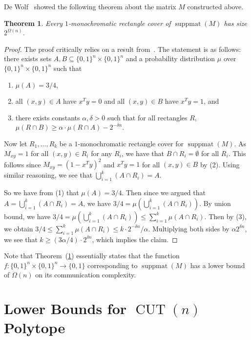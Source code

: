 \documentclass{article}
\newtheorem{theorem}{\sc Theorem}
\theoremstyle{definition}
\theoremstyle{remark}
\newcommand{\bits}{\{0,1\}}
\newcommand{\suppmat}{\operatorname{suppmat}}
\newcommand{\CUT}{\operatorname{CUT}}
\begin{document}
De Wolf~\cite{de-wolf} showed the following theorem about the matrix $M$ constructed above.
\begin{theorem}\label{theor:dewolf}
Every $1$-monochromatic rectangle cover of $\suppmat(M)$ has size $2^{\Omega(n)}$.
\end{theorem}
\begin{proof}
The proof critically relies on a result from~\cite{cc-nisan}. The statement is as follows: there exists sets $A, B \subseteq \bits^n \times \bits^n$ and a probability distribution $\mu$ over $\bits^n \times \bits^n$ such that 
\begin{enumerate}\itemsep0pt
\item $\mu(A) = 3/4$,
\item all $(x,y) \in A$ have $x^Ty =0$ and all $(x,y) \in B$ have $x^Ty = 1$, and 
\item there exists constants $\alpha, \delta > 0$ such that for all rectangles $R$,  $\mu(R \cap B) \ge \alpha \cdot \mu(R \cap A) - 2^{-\delta n}$.
\end{enumerate}

Now let $R_1, \ldots, R_k$ be a $1$-monochromatic rectangle cover for $\suppmat(M)$. As $M_{xy} = 1$ for all $(x,y) \in R_i$ for any $R_i$, we have that $B \cap R_i = \emptyset$ for all $R_i$. This follows since $M_{xy} = (1 - x^Ty)^2$ and $x^Ty = 1$ for all $(x,y) \in B$ by (2). Using similar reasoning, we see that $\bigcup_{i=1}^k (A \cap R_i) = A$. 

So we have from (1) that $\mu(A) = 3/4$. Then since we argued that $A = \bigcup_{i=1}^k (A \cap R_i) = A$, we have $3/4 = \mu(\bigcup_{i=1}^k (A \cap R_i))$. By union bound, we have $3/4 = \mu(\bigcup_{i=1}^k (A \cap R_i)) \le \sum_{i=1}^k \mu(A \cap R_i)$. Then by (3), we obtain $3/4 \le \sum_{i=1}^k \mu(A \cap R_i) \le k\cdot 2^{-\delta n} /\alpha$. Multiplying both sides by $\alpha2^{\delta n}$, we see that $k \ge (3\alpha/4)\cdot2^{\delta n}$, which implies the claim.
\end{proof}

Note that Theorem~(\ref{theor:dewolf}) essentially states that the function $f : \bits^n \times \bits^n \to \bits$ corresponding to $\suppmat(M)$ has a lower bound of $\Omega(n)$ on its communication complexity.

\section{Lower Bounds for $\CUT(n)$ Polytope}\label{sec:cut-polytope}
\end{document}
